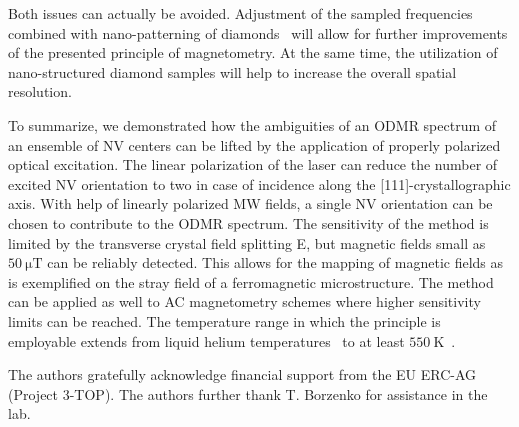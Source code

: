 \documentclass[
 reprint,
 amsmath,
 amssymb,
aps,
 prb,
showpacs
]{revtex4-1}
\begin{document}
Both issues can actually be avoided. Adjustment of the sampled frequencies combined with nano-patterning of diamonds~\cite{njphausmann,111litho} will allow for further improvements of the presented principle of magnetometry. At the same time, the utilization of nano-structured diamond samples will help to increase the overall spatial resolution. 

To summarize, we demonstrated how the ambiguities of an ODMR spectrum of an ensemble of NV centers can be lifted by the application of properly polarized optical excitation. The linear polarization of the laser can reduce the number of excited NV orientation to two in case of incidence along the [111]-crystallographic axis. With help of linearly polarized MW fields, a single NV orientation can be chosen to contribute to the ODMR spectrum. The sensitivity of the method is limited by the transverse crystal field splitting E, but magnetic fields small as $\SI{50}{\micro\tesla}$ can be reliably detected. This allows for the mapping of magnetic fields as is exemplified on the stray field of a ferromagnetic microstructure. The method can be applied as well to AC magnetometry schemes where higher sensitivity limits can be reached. The temperature range in which the principle is employable extends from liquid helium temperatures~\cite{apld(t)} to at least $\SI{550}{\kelvin}$~\cite{PhysRevX.2.031001}.
 
The authors gratefully acknowledge financial support from the EU ERC-AG (Project 3-TOP). The authors further thank T. Borzenko for assistance in the lab. 


\end{document}
